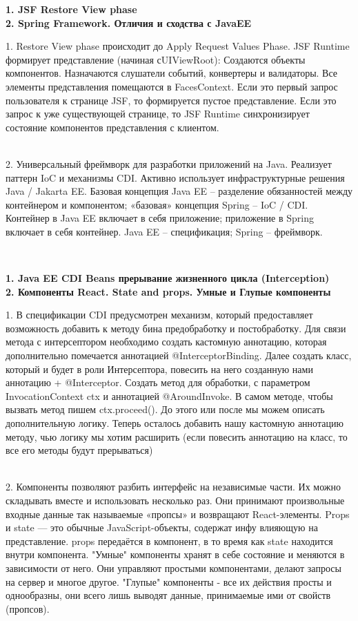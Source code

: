 \documentclass{article}
\newcommand{\bil}[4]{%
    \begin{minipage}{.3\textwidth}
        \textbf{1. #1} \\
        \textbf{2. #2}

        1. #3
        \\
        2. #4
    \end{minipage}
}
\begin{document}
\hfill
\bil{JSF Restore View phase}{Spring Framework. Отличия и сходства с JavaEE}{
    Restore View phase происходит до Apply Request Values Phase.
    JSF Runtime формирует представление (начиная сUIViewRoot): Создаются объекты компонентов. Назначаются слушатели событий, конвертеры и валидаторы.
    Все элементы представления помещаются в FacesContext.
    Если это первый запрос пользователя к странице JSF, то формируется пустое представление.
    Если это запрос к уже существующей странице, то JSF Runtime синхронизирует состояние компонентов представления с клиентом.
}{
    Универсальный фреймворк для разработки приложений на Java.
    Реализует паттерн IoC и механизмы CDI.
    Активно использует инфраструктурные решения Java / Jakarta EE.
    Базовая концепция Java EE – разделение обязанностей между контейнером и компонентом; «базовая» концепция Spring – IoC / CDI.
    Контейнер в Java EE включает в себя приложение; приложение в Spring включает в себя контейнер.
    Java EE – спецификация; Spring – фреймворк.
}
\\
\bil{Java EE CDI Beans прерывание жизненного цикла (Interception)}{Компоненты React. State and props. Умные и Глупые компоненты}{
    В спецификации CDI предусмотрен механизм, который предоставляет возможность добавить к методу бина предобработку и постобработку.
    Для связи метода с интерсептором необходимо создать кастомную аннотацию, которая дополнительно помечается аннотацией @InterceptorBinding.
    Далее создать класс, который и будет в роли Интерсептора, повесить на него созданную нами аннотацию + @Interceptor.
    Создать метод для обработки, с параметром InvocationContext ctx и аннотацией @AroundInvoke. В самом методе, чтобы вызвать метод пишем ctx.proceed(). До этого или после мы можем описать дополнительную логику.
    Теперь осталось добавить нашу кастомную аннотацию методу, чью логику мы хотим расширить (если повесить аннотацию на класс, то все его методы будут прерываться)
}{
    Компоненты позволяют разбить интерфейс на независимые части. Их можно складывать вместе и использовать несколько раз. Они принимают произвольные входные данные так называемые «пропсы» и возвращают React-элементы.
    Props и state — это обычные JavaScript-объекты, содержат инфу влияющую на представление. props передаётся в компонент, в то время как state находится внутри компонента.
    "Умные" компоненты хранят в себе состояние и меняются в зависимости от него. Они управляют простыми компонентами, делают запросы на сервер и многое другое.
    "Глупые" компоненты - все их действия просты и однообразны, они всего лишь выводят данные, принимаемые ими от свойств (пропсов).
}
\end{document}
